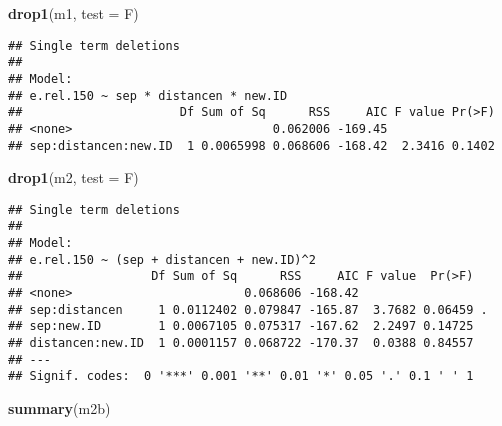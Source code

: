 \documentclass[
]{article}
\newenvironment{Shaded}{\begin{snugshade}}{\end{snugshade}}
\newcommand{\AttributeTok}[1]{\textcolor[rgb]{0.13,0.29,0.53}{#1}}
\newcommand{\FunctionTok}[1]{\textcolor[rgb]{0.13,0.29,0.53}{\textbf{#1}}}
\newcommand{\NormalTok}[1]{#1}
\newcommand{\StringTok}[1]{\textcolor[rgb]{0.31,0.60,0.02}{#1}}
\begin{document}
\begin{Shaded}
\begin{Highlighting}[]
\FunctionTok{drop1}\NormalTok{(m1, }\AttributeTok{test =} \StringTok{\textquotesingle{}F\textquotesingle{}}\NormalTok{)}
\end{Highlighting}
\end{Shaded}

\begin{verbatim}
## Single term deletions
## 
## Model:
## e.rel.150 ~ sep * distancen * new.ID
##                      Df Sum of Sq      RSS     AIC F value Pr(>F)
## <none>                            0.062006 -169.45               
## sep:distancen:new.ID  1 0.0065998 0.068606 -168.42  2.3416 0.1402
\end{verbatim}

\begin{Shaded}
\begin{Highlighting}[]
\FunctionTok{drop1}\NormalTok{(m2, }\AttributeTok{test =} \StringTok{\textquotesingle{}F\textquotesingle{}}\NormalTok{)}
\end{Highlighting}
\end{Shaded}

\begin{verbatim}
## Single term deletions
## 
## Model:
## e.rel.150 ~ (sep + distancen + new.ID)^2
##                  Df Sum of Sq      RSS     AIC F value  Pr(>F)  
## <none>                        0.068606 -168.42                  
## sep:distancen     1 0.0112402 0.079847 -165.87  3.7682 0.06459 .
## sep:new.ID        1 0.0067105 0.075317 -167.62  2.2497 0.14725  
## distancen:new.ID  1 0.0001157 0.068722 -170.37  0.0388 0.84557  
## ---
## Signif. codes:  0 '***' 0.001 '**' 0.01 '*' 0.05 '.' 0.1 ' ' 1
\end{verbatim}

\begin{Shaded}
\begin{Highlighting}[]
\FunctionTok{summary}\NormalTok{(m2b)}
\end{Highlighting}
\end{Shaded}
\end{document}

